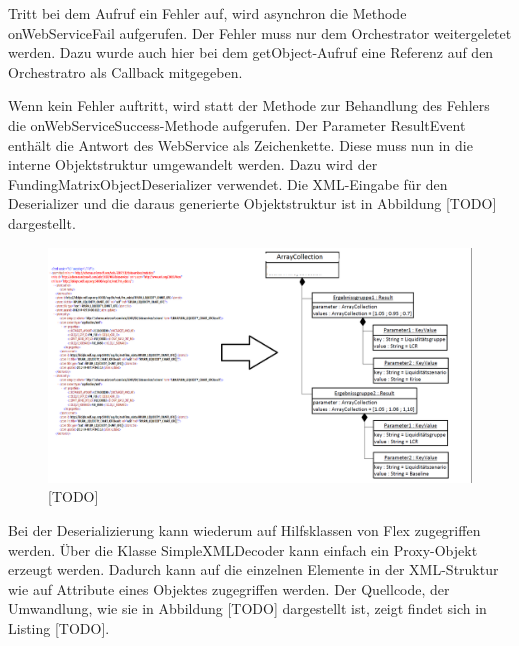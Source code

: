 Tritt bei dem Aufruf ein Fehler auf, wird asynchron die Methode onWebServiceFail aufgerufen. Der Fehler muss nur dem Orchestrator weitergeletet werden. Dazu wurde auch hier bei dem getObject-Aufruf eine Referenz auf den Orchestratro als Callback mitgegeben.

Wenn kein Fehler auftritt, wird statt der Methode zur Behandlung des Fehlers die onWebServiceSuccess-Methode aufgerufen. Der Parameter ResultEvent enthält die Antwort des WebService als Zeichenkette. Diese muss nun in die interne Objektstruktur umgewandelt werden. Dazu wird der FundingMatrixObjectDeserializer  verwendet. Die XML-Eingabe für den Deserializer und die daraus generierte Objektstruktur ist in Abbildung [TODO] dargestellt.

\begin{figure}[h]
\centering
\setlength{\unitlength}{1mm}
\includegraphics[width=15cm]{images/umwandlung.png}
\caption{[TODO] \label{[TODO]}}
\end{figure}

Bei der Deserializierung kann wiederum auf Hilfsklassen von Flex zugegriffen werden. Über die Klasse SimpleXMLDecoder kann einfach ein Proxy-Objekt erzeugt werden. Dadurch kann auf die einzelnen Elemente in der XML-Struktur wie auf Attribute eines Objektes zugegriffen werden. Der Quellcode, der Umwandlung, wie sie in Abbildung [TODO] dargestellt ist, zeigt findet sich in Listing [TODO].

